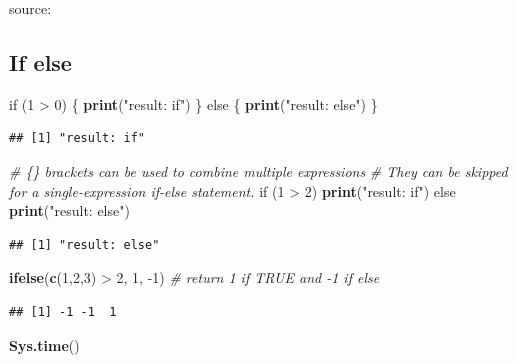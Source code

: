 \documentclass[]{book}
\newenvironment{Shaded}{\begin{snugshade}}{\end{snugshade}}
\newcommand{\KeywordTok}[1]{\textcolor[rgb]{0.13,0.29,0.53}{\textbf{{#1}}}}
\newcommand{\DecValTok}[1]{\textcolor[rgb]{0.00,0.00,0.81}{{#1}}}
\newcommand{\StringTok}[1]{\textcolor[rgb]{0.31,0.60,0.02}{{#1}}}
\newcommand{\CommentTok}[1]{\textcolor[rgb]{0.56,0.35,0.01}{\textit{{#1}}}}
\newcommand{\NormalTok}[1]{{#1}}
\theoremstyle{definition}
\theoremstyle{definition}
\theoremstyle{remark}
\begin{document}
source: \citep{Matloff2011}

\subsection{If else}\label{if-else}

\begin{Shaded}
\begin{Highlighting}[]
\NormalTok{if (}\DecValTok{1} \NormalTok{>}\StringTok{ }\DecValTok{0}\NormalTok{) \{}
  \KeywordTok{print}\NormalTok{(}\StringTok{"result: if"}\NormalTok{)}
\NormalTok{\} else \{}
  \KeywordTok{print}\NormalTok{(}\StringTok{"result: else"}\NormalTok{)}
\NormalTok{\}}
\end{Highlighting}
\end{Shaded}

\begin{verbatim}
## [1] "result: if"
\end{verbatim}

\begin{Shaded}
\begin{Highlighting}[]
\CommentTok{# \{\} brackets can be used to combine multiple expressions }
\CommentTok{# They can be skipped for a single-expression if-else statement. }
\NormalTok{if (}\DecValTok{1} \NormalTok{>}\StringTok{ }\DecValTok{2}\NormalTok{) }\KeywordTok{print}\NormalTok{(}\StringTok{"result: if"}\NormalTok{)  else }\KeywordTok{print}\NormalTok{(}\StringTok{"result: else"}\NormalTok{)}
\end{Highlighting}
\end{Shaded}

\begin{verbatim}
## [1] "result: else"
\end{verbatim}

\begin{Shaded}
\begin{Highlighting}[]
\KeywordTok{ifelse}\NormalTok{(}\KeywordTok{c}\NormalTok{(}\DecValTok{1}\NormalTok{,}\DecValTok{2}\NormalTok{,}\DecValTok{3}\NormalTok{) >}\StringTok{ }\DecValTok{2}\NormalTok{, }\DecValTok{1}\NormalTok{, -}\DecValTok{1}\NormalTok{)  }\CommentTok{# return 1 if TRUE and -1 if else  }
\end{Highlighting}
\end{Shaded}

\begin{verbatim}
## [1] -1 -1  1
\end{verbatim}

\begin{Shaded}
\begin{Highlighting}[]
\KeywordTok{Sys.time}\NormalTok{()}
\end{Highlighting}
\end{Shaded}
\end{document}
